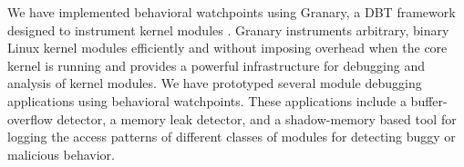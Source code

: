 We have implemented behavioral watchpoints using Granary, a DBT framework designed to instrument kernel modules \cite{GranaryAtOSDI, DynamoRIOKernel}. Granary instruments arbitrary, binary Linux kernel modules efficiently and without imposing overhead when the core kernel is running and provides a powerful infrastructure for debugging and analysis of kernel modules. We have prototyped several module debugging applications using behavioral watchpoints. These applications include a buffer-overflow detector, a memory leak detector, and a shadow-memory based tool for logging the access patterns of different classes of modules for detecting buggy or malicious behavior. %












